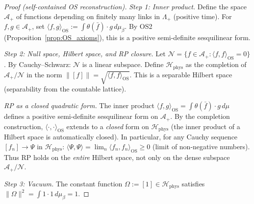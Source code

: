 \documentclass[11pt,a4paper]{amsart}
\theoremstyle{definition}
\begin{document}
\begin{proof}[Proof (self-contained OS reconstruction)]
\emph{Step 1: Inner product.}
Define the space $\mathcal{A}_+$ of functions depending on finitely many
links in $\Lambda_+$ (positive time).  For $f,g\in\mathcal{A}_+$, set
$\langle f, g\rangle_{\mathrm{OS}} := \int \theta(\bar f)\cdot g\,d\mu_\beta$.
By OS2 (Proposition~\ref{prop:OS_axioms}), this is a positive semi-definite
sesquilinear form.

\emph{Step 2: Null space, Hilbert space, and RP closure.}
Let $\mathcal{N} = \{f\in\mathcal{A}_+ : \langle f,f\rangle_{\mathrm{OS}} = 0\}$.
By Cauchy--Schwarz: $\mathcal{N}$ is a linear subspace.  Define
$\mathcal{H}_{\mathrm{phys}}$ as the completion of $\mathcal{A}_+/\mathcal{N}$
in the norm $\|[f]\| = \sqrt{\langle f,f\rangle_{\mathrm{OS}}}$.
This is a separable Hilbert space (separability from the countable lattice).

\emph{RP as a closed quadratic form.}
The inner product $\langle f,g\rangle_{\mathrm{OS}} = \int\theta(\bar f)\cdot g\,d\mu$
defines a positive semi-definite sesquilinear form on $\mathcal{A}_+$.
By the completion construction, $\langle\cdot,\cdot\rangle_{\mathrm{OS}}$
extends to a \emph{closed} form on $\mathcal{H}_{\mathrm{phys}}$
(the inner product of a Hilbert space is automatically closed).
In particular, for any Cauchy sequence $[f_n] \to \Psi$ in
$\mathcal{H}_{\mathrm{phys}}$:
$\langle\Psi,\Psi\rangle = \lim_n\langle f_n,f_n\rangle_{\mathrm{OS}} \ge 0$
(limit of non-negative numbers).  Thus RP holds on the \emph{entire}
Hilbert space, not only on the dense subspace $\mathcal{A}_+/\mathcal{N}$.

\emph{Step 3: Vacuum.}
The constant function $\Omega := [1] \in \mathcal{H}_{\mathrm{phys}}$
satisfies $\|\Omega\|^2 = \int 1\cdot 1\,d\mu_\beta = 1$.


\end{proof}
\end{document}
